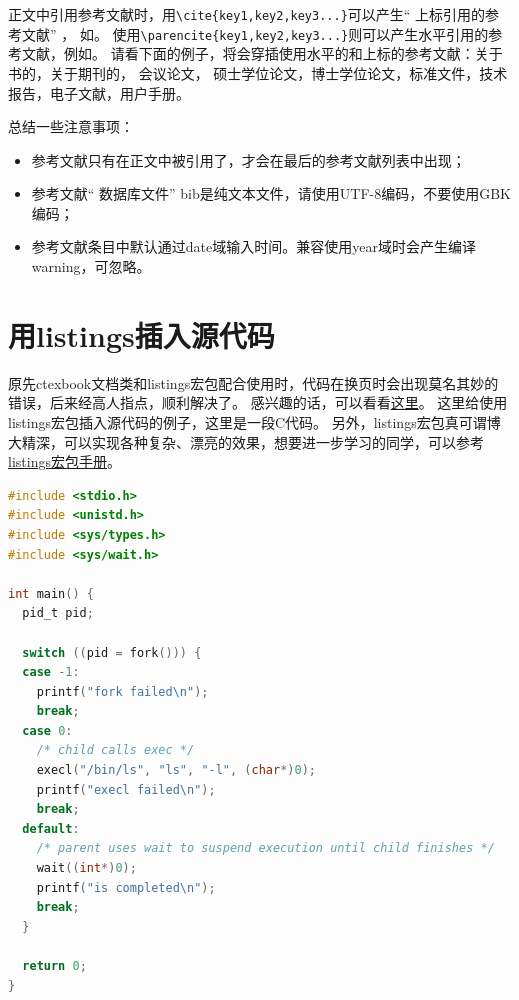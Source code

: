 \documentclass[doctor,openright,twoside]{sjtuthesis}
\theoremstyle{plain}
\theoremstyle{definition}
\theoremstyle{remark}
\theoremstyle{ocrenumbox}
\theoremstyle{plain}
\begin{document}
正文中引用参考文献时，用\verb+\cite{key1,key2,key3...}+可以产生`` 上标引用的参考文献'' ，
如\cite{Meta_CN,chen2007act,DPMG}。
使用\verb+\parencite{key1,key2,key3...}+则可以产生水平引用的参考文献，例如\parencite{JohnD,zhubajie,IEEE-1363}。
请看下面的例子，将会穿插使用水平的和上标的参考文献：关于书的\parencite{Meta_CN,JohnD,IEEE-1363}，关于期刊的\cite{chen2007act,chen2007ewi}，
会议论文\parencite{DPMG,kocher99,cnproceed}，
硕士学位论文\parencite{zhubajie,metamori2004}，博士学位论文\cite{shaheshang,FistSystem01,bai2008}，标准文件\parencite{IEEE-1363}，技术报告\cite{NPB2}，电子文献\parencite{xiaoyu2001, CHRISTINE1998}，用户手册\parencite{RManual}。

总结一些注意事项：

\begin{itemize}
\item 参考文献只有在正文中被引用了，才会在最后的参考文献列表中出现；
\item 参考文献“ 数据库文件” bib是纯文本文件，请使用UTF-8编码，不要使用GBK编码；
\item 参考文献条目中默认通过date域输入时间。兼容使用year域时会产生编译warning，可忽略。
\end{itemize}

\section{用listings插入源代码}

原先ctexbook文档类和listings宏包配合使用时，代码在换页时会出现莫名其妙的错误，后来经高人指点，顺利解决了。
感兴趣的话，可以看看\href{http://bbs.ctex.org/viewthread.php?tid=53451}{这里}。
这里给使用listings宏包插入源代码的例子，这里是一段C代码。
另外，listings宏包真可谓博大精深，可以实现各种复杂、漂亮的效果，想要进一步学习的同学，可以参考
\href{http://mirror.ctan.org/macros/latex/contrib/listings/listings.pdf}{listings宏包手册}。

\begin{lstlisting}[language={C}, caption={一段C源代码}]
#include <stdio.h>
#include <unistd.h>
#include <sys/types.h>
#include <sys/wait.h>

int main() {
  pid_t pid;

  switch ((pid = fork())) {
  case -1:
    printf("fork failed\n");
    break;
  case 0:
    /* child calls exec */
    execl("/bin/ls", "ls", "-l", (char*)0);
    printf("execl failed\n");
    break;
  default:
    /* parent uses wait to suspend execution until child finishes */
    wait((int*)0);
    printf("is completed\n");
    break;
  }

  return 0;
}
\end{lstlisting}
\end{document}
